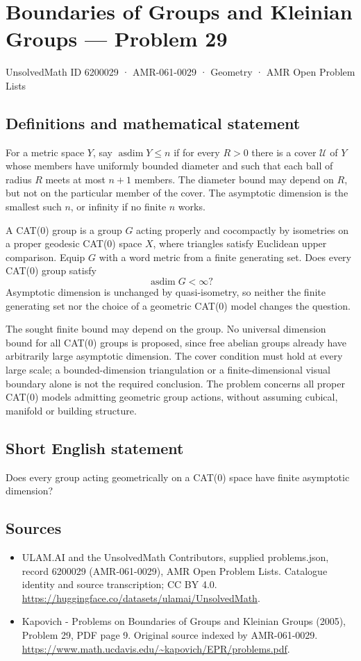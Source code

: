 \documentclass[11pt,a4paper]{article}
\begin{document}
\section*{Boundaries of Groups and Kleinian Groups — Problem 29}\label{6200029}
{\small UnsolvedMath ID 6200029 · AMR-061-0029 · Geometry · AMR Open Problem Lists}
\subsection{Definitions and mathematical statement}
For a metric space $Y$, say $\operatorname{asdim}Y\leq n$ if for every $R>0$ there is a cover $\mathcal U$ of $Y$ whose members have uniformly bounded diameter and such that each ball of radius $R$ meets at most $n+1$ members. The diameter bound may depend on $R$, but not on the particular member of the cover. The asymptotic dimension is the smallest such $n$, or infinity if no finite $n$ works.

A CAT(0) group is a group $G$ acting properly and cocompactly by isometries on a proper geodesic CAT(0) space $X$, where triangles satisfy Euclidean upper comparison. Equip $G$ with a word metric from a finite generating set. Does every CAT(0) group satisfy
\[
 \operatorname{asdim}G<\infty?
\]
Asymptotic dimension is unchanged by quasi-isometry, so neither the finite generating set nor the choice of a geometric CAT(0) model changes the question.

The sought finite bound may depend on the group. No universal dimension bound for all CAT(0) groups is proposed, since free abelian groups already have arbitrarily large asymptotic dimension. The cover condition must hold at every large scale; a bounded-dimension triangulation or a finite-dimensional visual boundary alone is not the required conclusion. The problem concerns all proper CAT(0) models admitting geometric group actions, without assuming cubical, manifold or building structure.
\subsection{Short English statement}
Does every group acting geometrically on a CAT(0) space have finite asymptotic dimension?
\subsection{Sources}
\begin{itemize}
\item[S1] ULAM.AI and the UnsolvedMath Contributors, supplied problems.json, record 6200029 (AMR-061-0029), AMR Open Problem Lists. Catalogue identity and source transcription; CC BY 4.0.
\url{https://huggingface.co/datasets/ulamai/UnsolvedMath}.
\item[S2] Kapovich - Problems on Boundaries of Groups and Kleinian Groups (2005), Problem 29, PDF page 9. Original source indexed by AMR-061-0029.
\url{https://www.math.ucdavis.edu/~kapovich/EPR/problems.pdf}.
\end{itemize}
\end{document}
